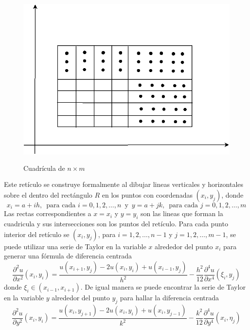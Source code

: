 \documentclass[a4paper]{article}
\begin{document}
\begin{figure}[h]
\begin{center}\label{fig::mesh}
\includegraphics[scale=0.29]{./lattice.png} 
\end{center} 
\caption{Cuadrícula de $n\times m$}
\end{figure}
Este retículo se construye formalmente al dibujar lineas verticales y horizontales sobre el dentro del rectángulo $R$ en los puntos con coordenadas $(x_i, y_j)$, donde
\begin{equation}
x_i=a+ih,\,\,\,\text{para cada }i=0,1,2,\hdots,n\, \text{ y }\, y=a+jk,\,\,\,\text{para cada }j=0,1,2,\hdots,m
\end{equation}
Las rectas correspondientes a $x=x_i$ y $y=y_i$ son las lineas que forman la cuadricula y sus intersecciones son los puntos del retículo. Para cada punto interior del retículo se $(x_i,y_j)$, para $i=1,2,\hdots,n-1$ y $j=1,2,\hdots,m-1$, se puede utilizar una serie de Taylor en la variable $x$ alrededor del punto $x_i$ para generar una fórmula de diferencia centrada
\begin{equation}
\frac{\partial^2 u}{\partial x^2}(x_i,y_i)=\frac{u(x_{i+1},y_j)-2u(x_i,y_i)+u(x_{i-1},y_j)}{h^2}-\frac{h^2}{12}\frac{\partial^4 u}{\partial x^4}(\xi_i,y_j)
\end{equation}
donde $\xi_i \in (x_{i-1},x_{i+1})$. De igual manera se puede encontrar la serie de Taylor en la variable $y$ alrededor del punto $y_j$ para hallar la diferencia centrada
\begin{equation}
\frac{\partial^2 u}{\partial y^2}(x_i,y_i)=\frac{u(x_{i},y_{j+1})-2u(x_i,y_i)+u(x_{i},y_{j-1})}{k^2}-\frac{k^2}{12}\frac{\partial^4 u}{\partial y^4}(x_i,\eta_j)
\end{equation}
\end{document}
